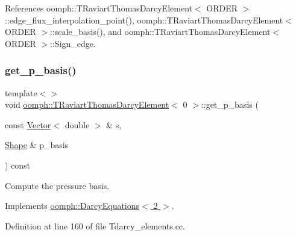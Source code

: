 References oomph\+::\+T\+Raviart\+Thomas\+Darcy\+Element$<$ O\+R\+D\+E\+R $>$\+::edge\+\_\+flux\+\_\+interpolation\+\_\+point(), oomph\+::\+T\+Raviart\+Thomas\+Darcy\+Element$<$ O\+R\+D\+E\+R $>$\+::scale\+\_\+basis(), and oomph\+::\+T\+Raviart\+Thomas\+Darcy\+Element$<$ O\+R\+D\+E\+R $>$\+::\+Sign\+\_\+edge.

\mbox{\label{classoomph_1_1TRaviartThomasDarcyElement_a4781dde90625537d52b7ca2eefaa0b18}} 
\subsubsection{\texorpdfstring{get\+\_\+p\+\_\+basis()}{get\_p\_basis()}\hspace{0.1cm}{\footnotesize\ttfamily [1/3]}}
{\footnotesize\ttfamily template$<$$>$ \\
void \hyperlink{classoomph_1_1TRaviartThomasDarcyElement}{oomph\+::\+T\+Raviart\+Thomas\+Darcy\+Element}$<$ 0 $>$\+::get\+\_\+p\+\_\+basis (\begin{DoxyParamCaption}\item[{const \hyperlink{classoomph_1_1Vector}{Vector}$<$ double $>$ \&}]{s,  }\item[{\hyperlink{classoomph_1_1Shape}{Shape} \&}]{p\+\_\+basis }\end{DoxyParamCaption}) const\hspace{0.3cm}{\ttfamily [virtual]}}



Compute the pressure basis. 



Implements \hyperlink{classoomph_1_1DarcyEquations_ab413b560166194e4a9d1b7de4742c5c0}{oomph\+::\+Darcy\+Equations$<$ 2 $>$}.



Definition at line 160 of file Tdarcy\+\_\+elements.\+cc.

\mbox{\label{classoomph_1_1TRaviartThomasDarcyElement_ab28d384f8b0f7c8b6f5c9d2a1b7f44bb}} 
